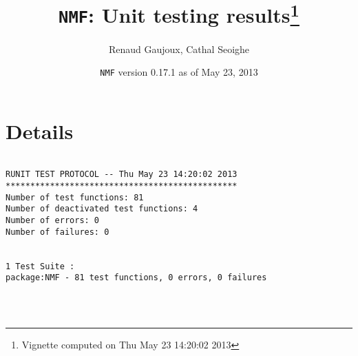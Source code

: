 \documentclass[10pt]{article}\usepackage{graphicx, color}
\author{Renaud Gaujoux, Cathal Seoighe}
\title{\texttt{NMF}: Unit testing results\footnote{Vignette computed  on Thu May 23 14:20:02 2013}}
\date{\texttt{NMF} version 0.17.1 as of May 23, 2013}
\begin{document}
\maketitle

\section{Details}
\begin{verbatim}

RUNIT TEST PROTOCOL -- Thu May 23 14:20:02 2013 
*********************************************** 
Number of test functions: 81 
Number of deactivated test functions: 4 
Number of errors: 0 
Number of failures: 0 

 
1 Test Suite : 
package:NMF - 81 test functions, 0 errors, 0 failures




\end{verbatim}
\end{document}
